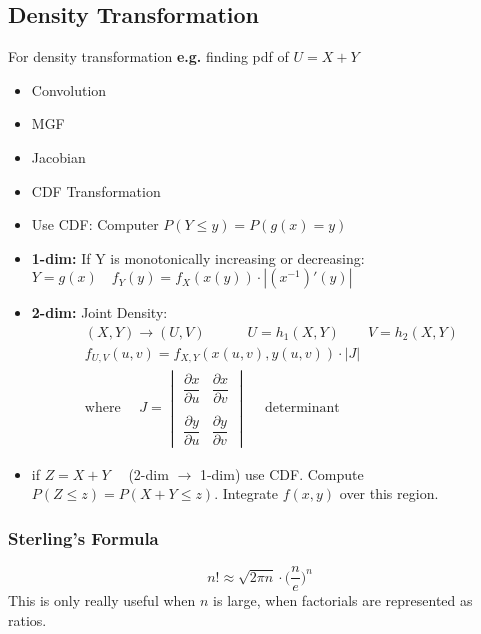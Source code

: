 \subsection*{Density Transformation}
For density transformation \textbf{e.g.} finding pdf of $U = X + Y$
\begin{multicols}{2}
	\begin{itemize}[label={--}]
	\item Convolution
	\item MGF
	\item Jacobian
	\item CDF Transformation
\end{itemize}
\end{multicols}
\begin{itemize}
	\item Use CDF: Computer $P(Y \leq y) = P(g(x) = y)$
	\item \textbf{1-dim: } If Y is monotonically increasing or decreasing: $Y = g(x) \quad \boxed{f_Y(y) = f_X(x(y)) \cdot |(x^{-1})'(y)|}$
	\item \textbf{2-dim: } Joint Density:
	\begin{gather*}
		(X, Y) \rightarrow (U, V) \quad \quad \quad U = h_1(X, Y) \quad \quad V = h_2(X,Y)\\
		f_{U,V}(u,v) = f_{X,Y}(x(u,v), y(u,v)) \cdot |J|\\
		\text{where } \quad J = \begin{vmatrix}
			\dfrac{\partial x}{\partial u} & \dfrac{\partial x}{\partial v}\\\\
			\dfrac{\partial y}{\partial u} & \dfrac{\partial y}{\partial v}
		\end{vmatrix} \quad \text{ determinant}
	\end{gather*}
	\item if $Z = X + Y\quad$ (2-dim $\rightarrow$ 1-dim) use CDF. Compute $P(Z \leq z) = P(X+Y \leq z)$. Integrate $f(x,y)$ over this region.
\end{itemize}
\subsubsection*{Sterling's Formula}
\begin{equation*}
	n! \approx \sqrt{2 \pi n} \cdot \bigg(\frac{n}{e} \bigg)^n
\end{equation*}
This is only really useful when $n$ is large, when factorials are represented as ratios.
